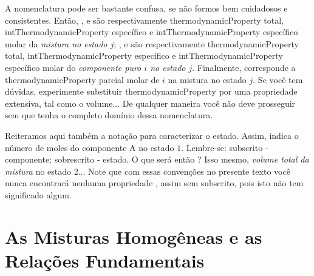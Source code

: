     A nomenclatura pode ser bastante confusa, se não formos bem cuidadosos e
    consistentes. Então, ,
     e
     são respectivamente
    \gls{thermodynamicProperty} total, \gls{intThermodynamicProperty}
    específico e \gls{intThermodynamicProperty} específico molar da
    \emph{mistura no estado $j$};
    ,
     e
     são respectivamente
    \gls{thermodynamicProperty} total, \gls{intThermodynamicProperty}
    específico e \gls{intThermodynamicProperty} específico molar do
    \emph{componente puro $i$ no estado $j$}. Finalmente,
     corresponde a
    \gls{thermodynamicProperty} parcial molar de $i$ na mistura no estado $j$.
    Se você tem dúvidas, experimente substituir \gls{thermodynamicProperty} por
    uma propriedade extensiva, tal como o volume... De qualquer maneira você
    não deve prosseguir sem que tenha o completo domínio dessa nomenclatura.

    Reiteramos aqui também a notação para caracterizar o estado. Assim,
     indica o número de moles do componente
    A no estado $1$.  Lembre-se: subscrito - componente; sobrescrito - estado.
    O que será então ?  Isso mesmo, \emph{volume total
    da mistura} no estado 2... Note que com essas convenções no presente texto
    você nunca encontrará nenhuma propriedade
    , assim sem subscrito, pois isto não tem
    significado algum.


    \section{As Misturas Homogêneas e as Relações Fundamentais}

